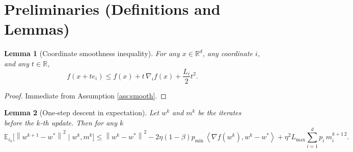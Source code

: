 \documentclass{article}
\newtheorem{lemma}{Lemma}
\newcommand{\E}{\mathbb{E}}
\newcommand{\R}{\mathbb{R}}
\newcommand{\norm}[1]{\left\lVert#1\right\rVert}
\newcommand{\ip}[2]{\left\langle #1,#2\right\rangle}
\begin{document}
\newpage
\section*{Preliminaries (Definitions and Lemmas)}
\begin{lemma}[Coordinate smoothness inequality]\label{lem:smooth}
For any $x\in\R^{d}$, any coordinate $i$, and any $t\in\R$,
\[
f(x+te_i)\le f(x)+t\,\nabla_i f(x)+\frac{L_i}{2}t^{2}.
\tag{L1}
\]
\end{lemma}
\begin{proof}
Immediate from Assumption \ref{ass:smooth}.
\end{proof}

\begin{lemma}[One‑step descent in expectation]\label{lem:one-step}
Let $w^{k}$ and $m^{k}$ be the iterates before the $k$‑th update. Then for any $k$
\[
\E_{i_k}\!\bigl[\norm{w^{k+1}-w^{*}}^{2}\mid w^{k},m^{k}\bigr]
\le \norm{w^{k}-w^{*}}^{2}
-2\eta(1-\beta)p_{\min}\,\ip{\nabla f(w^{k})}{w^{k}-w^{*}}
+\eta^{2}L_{\max}\!\sum_{i=1}^{d}p_i\,m_{i}^{k+1\,2}.
\tag{L2}
\]
\end{lemma}
\end{document}
